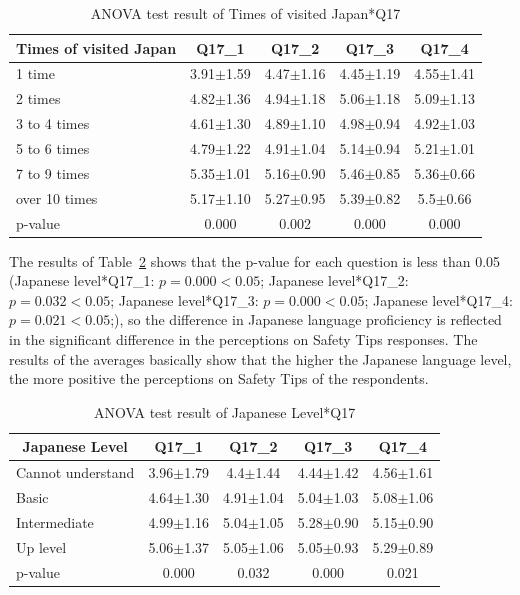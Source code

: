 \begin{table}[h]
  \caption{ANOVA test result of Times of visited Japan*Q17}
  \label{table32c}
  \centering
  \begin{tabular}{l|cccc}
 \hline
        \multicolumn{1}{c|}{Times of visited Japan}          & Q17\_1               & Q17\_2 & Q17\_3    & Q17\_4       \\
\hline
1 time        & 3.91$\pm$1.59 & 4.47$\pm$1.16   & 4.45$\pm$1.19   & 4.55$\pm$1.41 \\
2 times       & 4.82$\pm$1.36 & 4.94$\pm$1.18  & 5.06$\pm$1.18   & 5.09$\pm$1.13 \\
3 to 4 times  & 4.61$\pm$1.30 & 4.89$\pm$1.10 & 4.98$\pm$0.94 & 4.92$\pm$1.03  \\
5 to 6 times  & 4.79$\pm$1.22 & 4.91$\pm$1.04 & 5.14$\pm$0.94 & 5.21$\pm$1.01 \\
7 to 9 times  & 5.35$\pm$1.01 & 5.16$\pm$0.90 & 5.46$\pm$0.85 & 5.36$\pm$0.66 \\
over 10 times & 5.17$\pm$1.10& 5.27$\pm$0.95 & 5.39$\pm$0.82 & 5.5$\pm$0.66 \\           
\hline
p-value&           0.000&         0.002&         0.000&   0.000   \\
 \hline
  \end{tabular}
\end{table}


The results of Table~\ref{table32d} shows that the p-value for each question is less than 0.05 (Japanese level*Q17\_1: $p=0.000<0.05$; Japanese level*Q17\_2: $p=0.032<0.05$; Japanese level*Q17\_3: $p=0.000<0.05$; Japanese level*Q17\_4: $p=0.021<0.05$;), so the difference in Japanese language proficiency is reflected in the significant difference in the perceptions on Safety Tips responses. The results of the averages basically show that the higher the Japanese language level, the more positive the perceptions on Safety Tips of the respondents. 



\begin{table}[h]
  \caption{ANOVA test result of Japanese Level*Q17}
  \label{table32d}
  \centering
  \begin{tabular}{l|cccc}
 \hline
        \multicolumn{1}{c|}{Japanese Level}          & Q17\_1               & Q17\_2 & Q17\_3    & Q17\_4        \\
\hline
Cannot understand & 3.96$\pm$1.79& 4.4$\pm$1.44 & 4.44$\pm$1.42 & 4.56$\pm$1.61 \\
Basic             & 4.64$\pm$1.30 & 4.91$\pm$1.04 & 5.04$\pm$1.03  & 5.08$\pm$1.06  \\
Intermediate      & 4.99$\pm$1.16 & 5.04$\pm$1.05 & 5.28$\pm$0.90 & 5.15$\pm$0.90  \\
Up level          & 5.06$\pm$1.37& 5.05$\pm$1.06 & 5.05$\pm$0.93 & 5.29$\pm$0.89 \\        
\hline
p-value&           0.000&         0.032&         0.000&   0.021   \\
 \hline
  \end{tabular}
\end{table}



